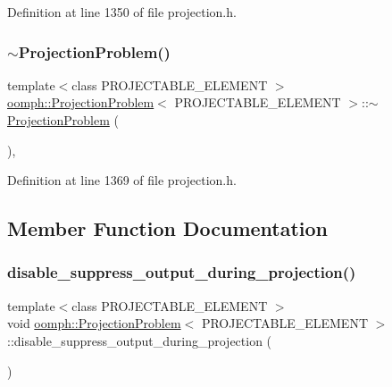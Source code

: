 Definition at line 1350 of file projection.\+h.

\mbox{\label{classoomph_1_1ProjectionProblem_a2b18253c5a5f783a329307315e9ef69c}} 
\subsubsection{\texorpdfstring{$\sim$\+Projection\+Problem()}{~ProjectionProblem()}}
{\footnotesize\ttfamily template$<$class P\+R\+O\+J\+E\+C\+T\+A\+B\+L\+E\+\_\+\+E\+L\+E\+M\+E\+NT $>$ \\
\hyperlink{classoomph_1_1ProjectionProblem}{oomph\+::\+Projection\+Problem}$<$ P\+R\+O\+J\+E\+C\+T\+A\+B\+L\+E\+\_\+\+E\+L\+E\+M\+E\+NT $>$\+::$\sim$\hyperlink{classoomph_1_1ProjectionProblem}{Projection\+Problem} (\begin{DoxyParamCaption}{ }\end{DoxyParamCaption})\hspace{0.3cm}{\ttfamily [inline]}, {\ttfamily [private]}}



Definition at line 1369 of file projection.\+h.



\subsection{Member Function Documentation}
\mbox{\label{classoomph_1_1ProjectionProblem_ab9bb57b5e9241388b4f90b37e338c454}} 
\subsubsection{\texorpdfstring{disable\+\_\+suppress\+\_\+output\+\_\+during\+\_\+projection()}{disable\_suppress\_output\_during\_projection()}}
{\footnotesize\ttfamily template$<$class P\+R\+O\+J\+E\+C\+T\+A\+B\+L\+E\+\_\+\+E\+L\+E\+M\+E\+NT $>$ \\
void \hyperlink{classoomph_1_1ProjectionProblem}{oomph\+::\+Projection\+Problem}$<$ P\+R\+O\+J\+E\+C\+T\+A\+B\+L\+E\+\_\+\+E\+L\+E\+M\+E\+NT $>$\+::disable\+\_\+suppress\+\_\+output\+\_\+during\+\_\+projection (\begin{DoxyParamCaption}{ }\end{DoxyParamCaption})\hspace{0.3cm}{\ttfamily [inline]}}



